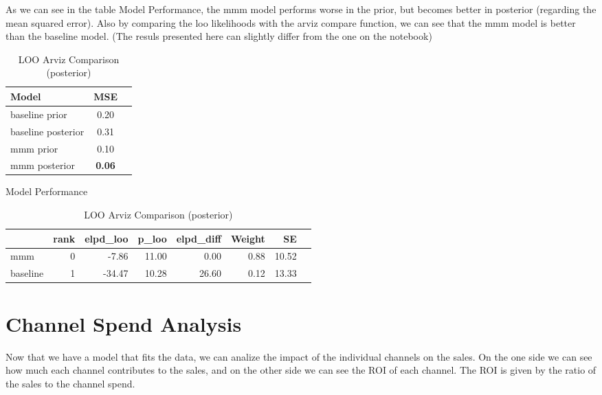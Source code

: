 \documentclass{article}
\begin{document}
As we can see in the table Model Performance, the mmm model performs worse in the prior, but becomes better in posterior (regarding the mean squared error).
Also by comparing the loo likelihoods with the arviz compare function, we can see that the mmm model is better than the baseline model. 
(The resuls presented here can slightly differ from the one on the notebook)
\begin{table}[H]
    
    \centering
    \begin{minipage}[t]{0.3\textwidth}
        \small
        \centering
        \begin{tabular}{lcc}
        \toprule
        \textbf{Model} & \textbf{MSE} \\
        \midrule
        baseline prior   & 0.20 \\
        baseline posterior   & 0.31 \\
        mmm prior  & 0.10 \\
        mmm posterior  & \textbf{0.06} \\
        \bottomrule
        \end{tabular}
        \caption{Model Performance}
        \label{tab:model_performance}
    \end{minipage}
    \hfill %
    \begin{minipage}[t]{0.65\textwidth}
        \small
        \centering
        \begin{tabular}{lrrrrrrr}
            \toprule
            & \textbf{rank} & \textbf{elpd\_loo} & \textbf{p\_loo} & \textbf{elpd\_diff} & \textbf{Weight} & \textbf{SE} \\
            \midrule
            mmm & 0 & -7.86 & 11.00 & 0.00 & 0.88 & 10.52 \\
            baseline & 1 & -34.47 & 10.28 & 26.60 & 0.12 & 13.33 \\
            \bottomrule
        \end{tabular}
        \caption{LOO Arviz Comparison (posterior)}
        \label{tab:loo_arviz_comparison}
    \end{minipage}
\end{table}


\section{Channel Spend Analysis}
Now that we have a model that fits the data, we can analize the impact of the individual channels on the sales.
On the one side we can see how much each channel contributes to the sales, and on the other side we can see the ROI of each channel.
The ROI is given by the ratio of the sales to the channel spend.
\end{document}
